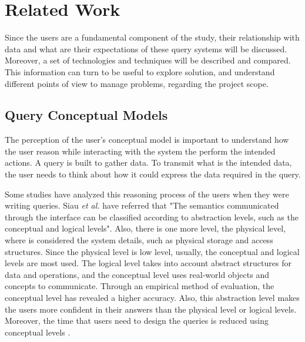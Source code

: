 \chapter{Related Work}
\label{cha:related_work}
Since the users are a fundamental component of the study, their relationship with data and what are their expectations of these query systems will be discussed. Moreover, a set of technologies and techniques will be described and compared. This information can turn to be useful to explore solution, and understand different points of view to manage problems, regarding the project scope. 

\section{Query Conceptual Models}
\label{sec:query_conceptual_models}
The perception of the user's conceptual model is important to understand how the user reason while interacting with the system the perform the intended actions. A query is built to gather data. To transmit what is the intended data, the user needs to think about how it could express the data required in the query.


Some studies have analyzed this reasoning process of the users when they were writing queries. Siau \textit{et al.} \cite{effectsOfQueryComplexityAndLearningOnNoviceUserQueryPerformance} have referred that "The semantics communicated through the interface can be classified according to abstraction levels, such as the conceptual and logical levels". Also, there is one more level, the physical level, where is considered the system details, such as physical storage and access structures. Since the physical level is low level, usually, the conceptual and logical levels are most used. The logical level takes into account abstract structures for data and operations, and the conceptual level uses real-world objects and concepts to communicate. Through an empirical method of evaluation, the conceptual level has revealed a higher accuracy. Also, this abstraction level makes the users more confident in their answers than the physical level or logical levels. Moreover, the time that users need to design the queries is reduced using conceptual levels \cite{effectsOfQueryComplexityAndLearningOnNoviceUserQueryPerformance}.

